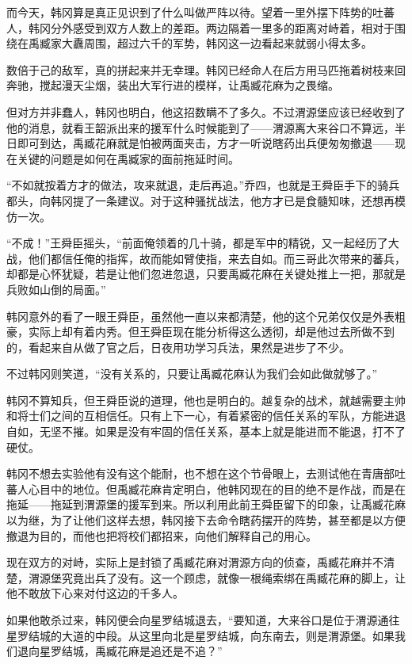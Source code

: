 而今天，韩冈算是真正见识到了什么叫做严阵以待。望着一里外摆下阵势的吐蕃人，韩冈分外感受到双方人数上的差距。两边隔着一里多的距离对峙着，相对于围绕在禹臧家大纛周围，超过六千的军势，韩冈这一边看起来就弱小得太多。

数倍于己的敌军，真的拼起来并无幸理。韩冈已经命人在后方用马匹拖着树枝来回奔驰，搅起漫天尘烟，装出大军行进的模样，让禹臧花麻为之畏缩。

但对方并非蠢人，韩冈也明白，他这招数瞒不了多久。不过渭源堡应该已经收到了他的消息，就看王韶派出来的援军什么时候能到了——渭源离大来谷口不算远，半日即可到达，禹臧花麻就是怕被两面夹击，方才一听说瞎药出兵便匆匆撤退——现在关键的问题是如何在禹臧家的面前拖延时间。

“不如就按着方才的做法，攻来就退，走后再追。”乔四，也就是王舜臣手下的骑兵都头，向韩冈提了一条建议。对于这种骚扰战法，他方才已是食髓知味，还想再模仿一次。

“不成！”王舜臣摇头，“前面俺领着的几十骑，都是军中的精锐，又一起经历了大战，他们都信任俺的指挥，故而能如臂使指，来去自如。而三哥此次带来的蕃兵，却都是心怀犹疑，若是让他们忽进忽退，只要禹臧花麻在关键处推上一把，那就是兵败如山倒的局面。”

韩冈意外的看了一眼王舜臣，虽然他一直以来都清楚，他的这个兄弟仅仅是外表粗豪，实际上却有着内秀。但王舜臣现在能分析得这么透彻，却是他过去所做不到的，看起来自从做了官之后，日夜用功学习兵法，果然是进步了不少。

不过韩冈则笑道，“没有关系的，只要让禹臧花麻认为我们会如此做就够了。”

韩冈不算知兵，但王舜臣说的道理，他也是明白的。越复杂的战术，就越需要主帅和将士们之间的互相信任。只有上下一心，有着紧密的信任关系的军队，方能进退自如，无坚不摧。如果是没有牢固的信任关系，基本上就是能进而不能退，打不了硬仗。

韩冈不想去实验他有没有这个能耐，也不想在这个节骨眼上，去测试他在青唐部吐蕃人心目中的地位。但禹臧花麻肯定明白，他韩冈现在的目的绝不是作战，而是在拖延——拖延到渭源堡的援军到来。所以利用此前王舜臣留下的印象，让禹臧花麻以为继，为了让他们这样去想，韩冈接下去命令瞎药摆开的阵势，甚至都是以方便撤退为目的，而他也把将校们都招来，向他们解释自己的用心。

现在双方的对峙，实际上是封锁了禹臧花麻对渭源方向的侦查，禹臧花麻并不清楚，渭源堡究竟出兵了没有。这一个顾虑，就像一根绳索绑在禹臧花麻的脚上，让他不敢放下心来对付这边的千多人。

如果他敢杀过来，韩冈便会向星罗结城退去，“要知道，大来谷口是位于渭源通往星罗结城的大道的中段。从这里向北是星罗结城，向东南去，则是渭源堡。如果我们退向星罗结城，禹臧花麻是追还是不追？”

